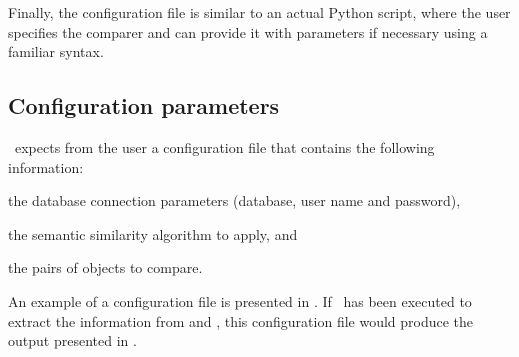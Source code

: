 Finally, the configuration file is similar to an actual Python script, where the user specifies the comparer and can provide it with parameters if necessary using a familiar syntax.


\subsection{Configuration parameters} \label{sub:mossy/config}

\mossy\ expects from the user a configuration file that contains the following information:
\begin{paralist}
    \item the database connection parameters (database, user name and password),
    \item the semantic similarity algorithm to apply, and
    \item the pairs of objects to compare.
\end{paralist}
An example of a configuration file is presented in . If \owlsql\ has been executed to extract the information from  and , this configuration file would produce the output presented in .

